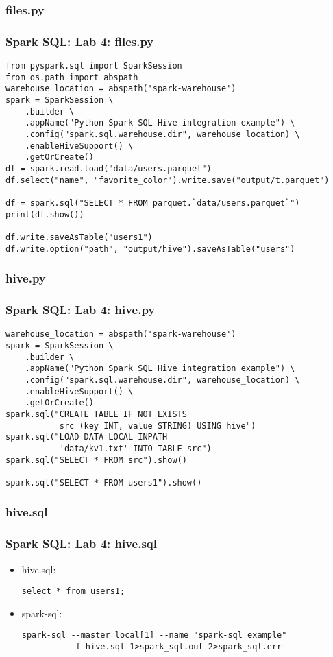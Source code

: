 \subsubsection{files.py}
\begin{frame}[fragile]
  \frametitle{Spark SQL: Lab 4: files.py}
{\small
{\color{mycolorcode}
\begin{verbatim}
from pyspark.sql import SparkSession
from os.path import abspath
warehouse_location = abspath('spark-warehouse')
spark = SparkSession \
    .builder \
    .appName("Python Spark SQL Hive integration example") \
    .config("spark.sql.warehouse.dir", warehouse_location) \
    .enableHiveSupport() \
    .getOrCreate()
df = spark.read.load("data/users.parquet")
df.select("name", "favorite_color").write.save("output/t.parquet")

df = spark.sql("SELECT * FROM parquet.`data/users.parquet`")
print(df.show())

df.write.saveAsTable("users1")
df.write.option("path", "output/hive").saveAsTable("users")
\end{verbatim}
}
}
\end{frame}



\subsubsection{hive.py}
\begin{frame}[fragile]
  \frametitle{Spark SQL: Lab 4: hive.py}
{\small
{\color{mycolorcode}
\begin{verbatim}
warehouse_location = abspath('spark-warehouse')
spark = SparkSession \
    .builder \
    .appName("Python Spark SQL Hive integration example") \
    .config("spark.sql.warehouse.dir", warehouse_location) \
    .enableHiveSupport() \
    .getOrCreate()
spark.sql("CREATE TABLE IF NOT EXISTS 
           src (key INT, value STRING) USING hive")
spark.sql("LOAD DATA LOCAL INPATH 
           'data/kv1.txt' INTO TABLE src")
spark.sql("SELECT * FROM src").show()

spark.sql("SELECT * FROM users1").show()
\end{verbatim}
}
}
\end{frame}


\subsubsection{hive.sql}
\begin{frame}[fragile]
\frametitle{Spark SQL: Lab 4: hive.sql}
\begin{itemize}
\item hive.sql:
{\small
{\color{mycolorcode}
\begin{verbatim}
select * from users1;
\end{verbatim}
}
}

\item spark-sql:
{\small
{\color{mycolorcli}
\begin{verbatim}
spark-sql --master local[1] --name "spark-sql example" 
          -f hive.sql 1>spark_sql.out 2>spark_sql.err
\end{verbatim}
}
}
\end{itemize}
\end{frame}
